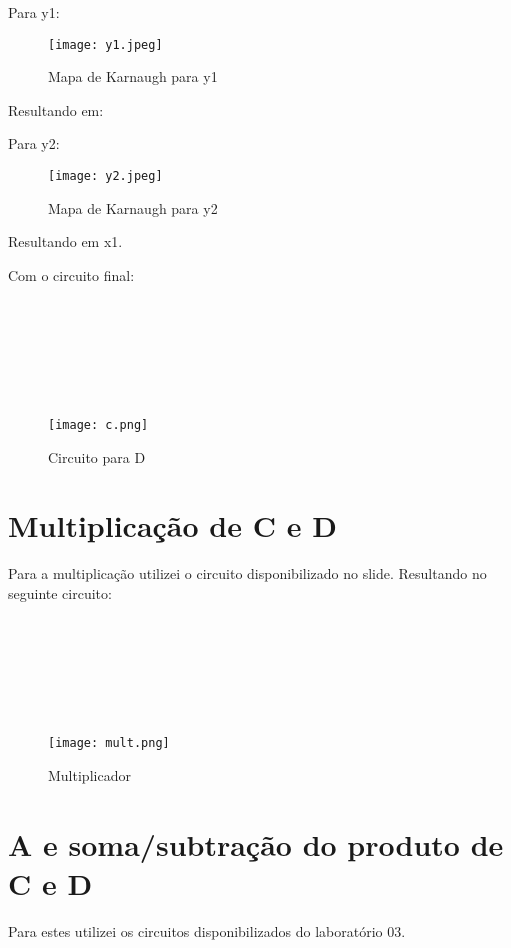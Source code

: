 \documentclass{article}
\begin{document}
Para y1:

\begin{figure}[!h]
\centering
\texttt{[image: y1.jpeg]}
\caption{Mapa de Karnaugh para y1}
\label{fig:CL_logo}
\end{figure}

Resultando em: 

Para y2:

\begin{figure}[!h]
\centering
\texttt{[image: y2.jpeg]}
\caption{Mapa de Karnaugh para y2}
\label{fig:CL_logo}
\end{figure}


Resultando em x1.


Com o circuito final:
\\
\\
\\
\\
\\
\\
\\
\begin{figure}[!h]
\centering
\texttt{[image: c.png]}
\caption{Circuito para D}
\label{fig:CL_logo}
\end{figure}


\section{Multiplicação de C e D}

Para a multiplicação utilizei o circuito disponibilizado no slide.
Resultando no seguinte circuito:
\\

\\
\\
\\
\\
\\
\\

\begin{figure}[!h]
\centering
\texttt{[image: mult.png]}
\caption{Multiplicador}
\label{fig:CL_logo}
\end{figure}

\section{A e soma/subtração do produto de C e D}

Para estes utilizei os circuitos disponibilizados do laboratório 03.
\end{document}
